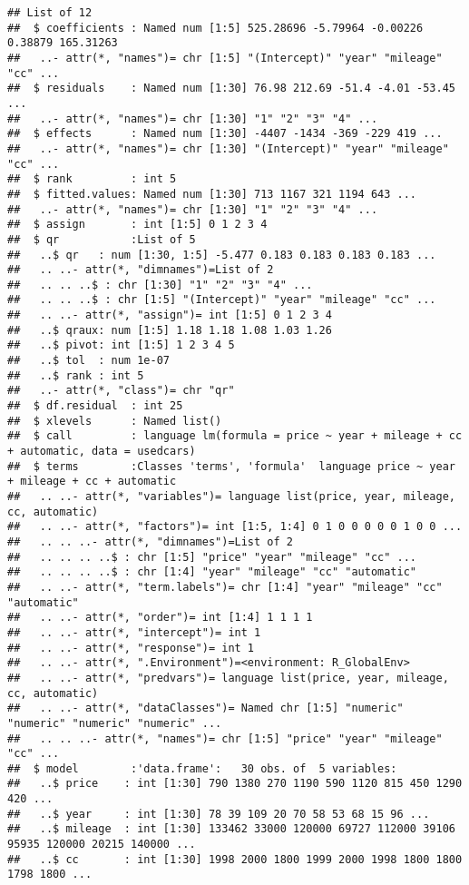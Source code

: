 \documentclass[
]{book}
\begin{document}
\begin{verbatim}
## List of 12
##  $ coefficients : Named num [1:5] 525.28696 -5.79964 -0.00226 0.38879 165.31263
##   ..- attr(*, "names")= chr [1:5] "(Intercept)" "year" "mileage" "cc" ...
##  $ residuals    : Named num [1:30] 76.98 212.69 -51.4 -4.01 -53.45 ...
##   ..- attr(*, "names")= chr [1:30] "1" "2" "3" "4" ...
##  $ effects      : Named num [1:30] -4407 -1434 -369 -229 419 ...
##   ..- attr(*, "names")= chr [1:30] "(Intercept)" "year" "mileage" "cc" ...
##  $ rank         : int 5
##  $ fitted.values: Named num [1:30] 713 1167 321 1194 643 ...
##   ..- attr(*, "names")= chr [1:30] "1" "2" "3" "4" ...
##  $ assign       : int [1:5] 0 1 2 3 4
##  $ qr           :List of 5
##   ..$ qr   : num [1:30, 1:5] -5.477 0.183 0.183 0.183 0.183 ...
##   .. ..- attr(*, "dimnames")=List of 2
##   .. .. ..$ : chr [1:30] "1" "2" "3" "4" ...
##   .. .. ..$ : chr [1:5] "(Intercept)" "year" "mileage" "cc" ...
##   .. ..- attr(*, "assign")= int [1:5] 0 1 2 3 4
##   ..$ qraux: num [1:5] 1.18 1.18 1.08 1.03 1.26
##   ..$ pivot: int [1:5] 1 2 3 4 5
##   ..$ tol  : num 1e-07
##   ..$ rank : int 5
##   ..- attr(*, "class")= chr "qr"
##  $ df.residual  : int 25
##  $ xlevels      : Named list()
##  $ call         : language lm(formula = price ~ year + mileage + cc + automatic, data = usedcars)
##  $ terms        :Classes 'terms', 'formula'  language price ~ year + mileage + cc + automatic
##   .. ..- attr(*, "variables")= language list(price, year, mileage, cc, automatic)
##   .. ..- attr(*, "factors")= int [1:5, 1:4] 0 1 0 0 0 0 0 1 0 0 ...
##   .. .. ..- attr(*, "dimnames")=List of 2
##   .. .. .. ..$ : chr [1:5] "price" "year" "mileage" "cc" ...
##   .. .. .. ..$ : chr [1:4] "year" "mileage" "cc" "automatic"
##   .. ..- attr(*, "term.labels")= chr [1:4] "year" "mileage" "cc" "automatic"
##   .. ..- attr(*, "order")= int [1:4] 1 1 1 1
##   .. ..- attr(*, "intercept")= int 1
##   .. ..- attr(*, "response")= int 1
##   .. ..- attr(*, ".Environment")=<environment: R_GlobalEnv> 
##   .. ..- attr(*, "predvars")= language list(price, year, mileage, cc, automatic)
##   .. ..- attr(*, "dataClasses")= Named chr [1:5] "numeric" "numeric" "numeric" "numeric" ...
##   .. .. ..- attr(*, "names")= chr [1:5] "price" "year" "mileage" "cc" ...
##  $ model        :'data.frame':   30 obs. of  5 variables:
##   ..$ price    : int [1:30] 790 1380 270 1190 590 1120 815 450 1290 420 ...
##   ..$ year     : int [1:30] 78 39 109 20 70 58 53 68 15 96 ...
##   ..$ mileage  : int [1:30] 133462 33000 120000 69727 112000 39106 95935 120000 20215 140000 ...
##   ..$ cc       : int [1:30] 1998 2000 1800 1999 2000 1998 1800 1800 1798 1800 ...

\end{verbatim}
\end{document}

